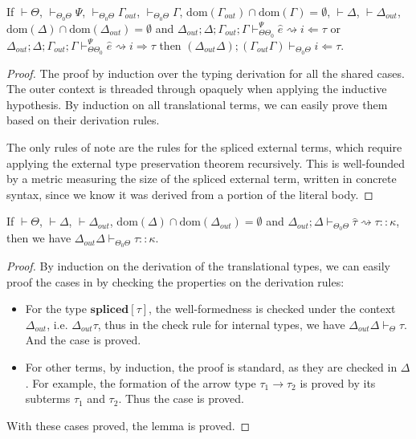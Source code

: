 \documentclass{sig-alternate}
\begin{document}
\begin{lemma}
If $\vdash\Theta$, $\vdash_{\Theta_0\Theta} \Psi$, $\vdash_{\Theta_0\Theta}\Gamma_{out}$, $\vdash_{\Theta_0\Theta}\Gamma$, $\text{dom}(\Gamma_{out})\cap \text{dom}(\Gamma)=\emptyset$, $\vdash\Delta$, $\vdash\Delta_{out}$, $\text{dom}(\Delta)\cap\text{dom}(\Delta_{out})=\emptyset$ and $\Delta_{out};\Delta;\Gamma_{out};\Gamma\vdash_{\Theta\Theta_0}^{\Psi}\hat{e}\rightsquigarrow i\Leftarrow\tau$ or $\Delta_{out};\Delta;\Gamma_{out};\Gamma\vdash_{\Theta\Theta_0}^{\Psi}\hat{e}\rightsquigarrow i\Rightarrow \tau$ then $(\Delta_{out}\Delta);(\Gamma_{out}\Gamma)\vdash_{\Theta_0\Theta}i\Leftarrow \tau$.
\end{lemma}
\begin{proof}
The proof by induction over the typing derivation for all the shared cases. The outer context is threaded through opaquely when applying the inductive hypothesis. By induction on all translational terms, we can easily prove them based on their derivation rules.

The only rules of note are the rules for the spliced external terms, which require applying the external type preservation theorem recursively.
This is well-founded by a metric measuring the size of the spliced external term, written
in concrete syntax, since we know it was derived from a portion of the literal body.
\end{proof}

\begin{lemma}
If $\vdash\Theta$, $\vdash\Delta$, $\vdash\Delta_{out}$, $\text{dom}(\Delta)\cap\text{dom}(\Delta_{out})=\emptyset$ and $\Delta_{out};\Delta\vdash_{\Theta_0\Theta}\hat\tau\rightsquigarrow\tau::\kappa$, then we have $\Delta_{out}\Delta\vdash_{\Theta_0\Theta}\tau::\kappa$.
\end{lemma}
\begin{proof}
By induction on the derivation of the translational types, we can easily proof the cases in by checking the properties on the derivation rules:
\begin{itemize}
\item For the type $\mathbf{spliced}[\tau]$, the well-formedness is checked under the context $\Delta_{out}$, i.e. $\Delta_{out}\tau$, thus in the check rule for internal types, we have $\Delta_{out}\Delta\vdash_{\Theta}\tau$. And the case is proved.
\item For other terms, by induction, the proof is standard, as they are checked in $\Delta$. For example, the formation of the arrow type $\tau_1\rightarrow\tau_2$ is proved by its subterms $\tau_1$ and $\tau_2$. Thus the case is proved.
\end{itemize}
With these cases proved, the lemma is proved.
\end{proof}
\end{document}
